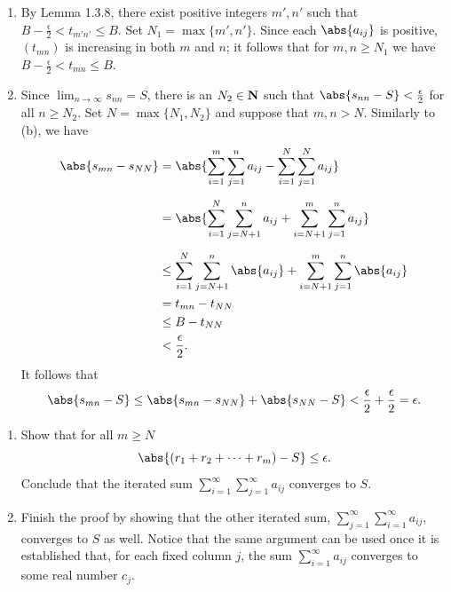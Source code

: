 \documentclass{lew98_solutions}
\begin{document}
\begin{solution}
    \begin{enumerate}
        \item By Lemma 1.3.8, there exist positive integers \( m', n' \) such that \( B - \tfrac{\epsilon}{2} < t_{m' n'} \leq B \). Set \( N_1 = \max \{ m', n' \} \). Since each \( \abs{a_{ij}} \) is positive, \( (t_{mn}) \) is increasing in both \( m \) and \( n \); it follows that for \( m, n \geq N_1 \) we have \( B - \tfrac{\epsilon}{2} < t_{mn} \leq B \).

        \item Since \( \lim_{n \to \infty} s_{nn} = S \), there is an \( N_2 \in \mathbf{N} \) such that \( \abs{s_{nn} - S} < \frac{\epsilon}{2} \) for all \( n \geq N_2 \). Set \( N = \max \{ N_1, N_2 \} \) and suppose that \( m, n > N \). Similarly to  (b), we have
        \begin{align*}
            \abs{s_{mn} - s_{NN}} &= \abs{\sum_{i=1}^m \sum_{j=1}^n a_{ij} - \sum_{i=1}^N \sum_{j=1}^N a_{ij}} \\[2mm]
            &= \abs{\sum_{i=1}^N \sum_{j=N+1}^n a_{ij} + \sum_{i=N+1}^m \sum_{j=1}^n a_{ij}} \\[2mm]
            &\leq \sum_{i=1}^N \sum_{j=N+1}^n \abs{a_{ij}} + \sum_{i=N+1}^m \sum_{j=1}^n \abs{a_{ij}} \\
            &= t_{mn} - t_{NN} \\
            &\leq B - t_{NN} \\
            &< \frac{\epsilon}{2}.
        \end{align*}
        It follows that
        \[
            \abs{s_{mn} - S} \leq \abs{s_{mn} - s_{NN}} + \abs{s_{NN} - S} < \frac{\epsilon}{2} + \frac{\epsilon}{2} = \epsilon.
        \]
    \end{enumerate}
\end{solution}

\begin{exercise}
\label{ex:2.8.5}
    \begin{enumerate}
        \item Show that for all \( m \geq N \)
        \[
            \abs{(r_1 + r_2 + \cdots + r_m) - S} \leq \epsilon.
        \]
        Conclude that the iterated sum \( \sum_{i=1}^{\infty} \sum_{j=1}^{\infty} a_{ij} \) converges to \( S \).

        \item Finish the proof by showing that the other iterated sum, \( \sum_{j=1}^{\infty} \sum_{i=1}^{\infty} a_{ij} \), converges to \( S \) as well. Notice that the same argument can be used once it is established that, for each fixed column \( j \), the sum \( \sum_{i=1}^{\infty} a_{ij} \) converges to some real number \( c_j \).
    \end{enumerate}
\end{exercise}
\end{document}

